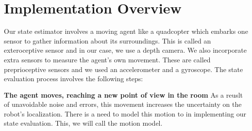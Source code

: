 \documentclass[]{article}
\begin{document}
{%

\section{Implementation Overview}
\label{sub:implementation_overview}
Our state estimator involves a moving agent like a quadcopter which embarks one sensor to gather information about its surroundings. This is called an exteroceptive sensor and in our case, we use a depth camera. We also incorporate extra sensors to measure the agent's own movement. These are called preprioceptive sensors and we used an accelerometer and a gyroscope. The state evaluation process involves the following steps:

\textbf{The agent moves, reaching a new point of view in the room} As a reuslt of unavoidable noise
and errors, this movement increases the uncertainty on the robot's localization.
There is a need to model this motion to in implementing our state evaluation. This, we will call the motion model.

}
\end{document}
